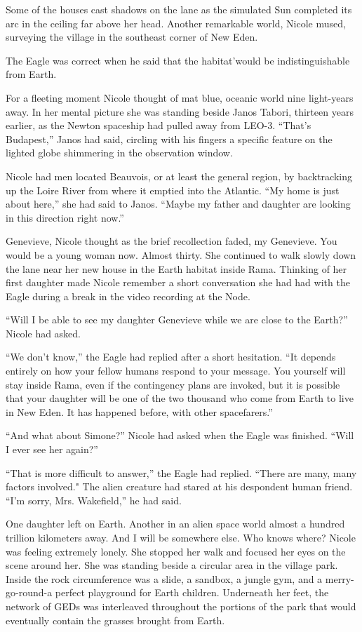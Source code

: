 \documentclass[]{article}
\begin{document}
{Some of the houses cast shadows on the lane as the simulated Sun completed its arc in the ceiling far above her head.  Another remarkable world, Nicole mused, surveying the village in the southeast corner of New Eden.

The Eagle was correct when he said that the habitat’would be indistinguishable from Earth.

For a fleeting moment Nicole thought of mat blue, oceanic world nine light-years away.  In her mental picture she was standing beside Janos Tabori, thirteen years earlier, as the Newton spaceship had pulled away from LEO-3.  “That’s Budapest,” Janos had said, circling with his fingers a specific feature on the lighted globe shimmering in the observation window.

Nicole had men located Beauvois, or at least the general region, by backtracking up the Loire River from where it emptied into the Atlantic.  “My home is just about here,” she had said to Janos.  “Maybe my father and daughter are looking in this direction right now.”

Genevieve, Nicole thought as the brief recollection faded, my Genevieve.  You would be a young woman now.  Almost thirty.  She continued to walk slowly down the lane near her new house in the Earth habitat inside Rama.  Thinking of her first daughter made Nicole remember a short conversation she had had with the Eagle during a break in the video recording at the Node.

“Will I be able to see my daughter Genevieve while we are close to the Earth?” Nicole had asked.

“We don’t know,” the Eagle had replied after a short hesitation.  “It depends entirely on how your fellow humans respond to your message.  You yourself will stay inside Rama, even if the contingency plans are invoked, but it is possible that your daughter will be one of the two thousand who come from Earth to live in New Eden.  It has happened before, with other spacefarers.”

“And what about Simone?” Nicole had asked when the Eagle was finished.  “Will I ever see her again?”

“That is more difficult to answer,” the Eagle had replied.  “There are many, many factors involved."  The alien creature had stared at his despondent human friend.  “I’m sorry, Mrs.  Wakefield,” he had said.

One daughter left on Earth.  Another in an alien space world almost a hundred trillion kilometers away.  And I will be somewhere else.  Who knows where? Nicole was feeling extremely lonely.  She stopped her walk and focused her eyes on the scene around her.  She was standing beside a circular area in the village park.  Inside the rock circumference was a slide, a sandbox, a jungle gym, and a merry-go-round-a perfect playground for Earth children.  Underneath her feet, the network of GEDs was interleaved throughout the portions of the park that would eventually contain the grasses brought from Earth.

}
\end{document}
